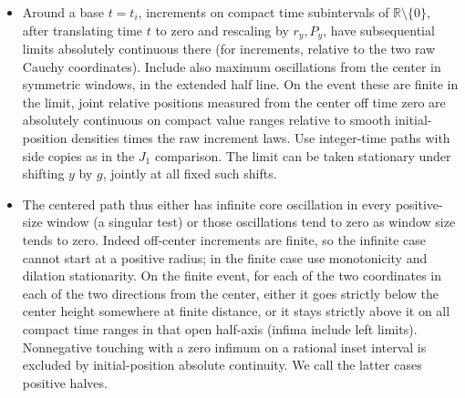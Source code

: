 \begin{lemma}\label{end:typical-tangents}
\leavevmode

\begin{itemize}
\item
  Around a base \(t=t_i\), increments on compact time subintervals of
  \(\mathbb R\setminus\{0\}\), after translating time \(t\) to zero and rescaling by
  \(r_y,P_y\), have subsequential limits absolutely continuous there (for increments,
  relative to the two raw Cauchy coordinates). Include also maximum oscillations from the
  center in symmetric windows, in the extended half line. On the event these are finite in
  the limit, joint relative positions measured from the center off time zero are
  absolutely continuous on compact value ranges relative to smooth initial-position
  densities times the raw increment laws. Use integer-time paths with side copies as in
  the \(J_1\) comparison. The limit can be taken stationary under shifting \(y\) by \(g\),
  jointly at all fixed such shifts.
\item
  The centered path thus either has infinite core oscillation in every positive-size
  window (a singular test) or those oscillations tend to zero as window size tends to
  zero. Indeed off-center increments are finite, so the infinite case cannot start at a
  positive radius; in the finite case use monotonicity and dilation stationarity. On the
  finite event, for each of the two coordinates in each of the two directions from the
  center, either it goes strictly below the center height somewhere at finite distance, or
  it stays strictly above it on all compact time ranges in that open half-axis (infima
  include left limits). Nonnegative touching with a zero infimum on a rational inset
  interval is excluded by initial-position absolute continuity. We call the latter cases
  positive halves.
\end{itemize}

\end{lemma}

